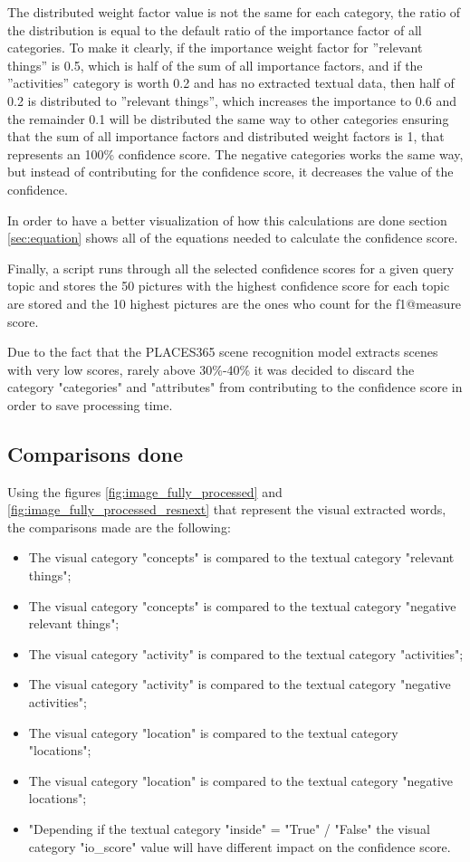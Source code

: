     The distributed weight factor value is not the same for each category, the ratio of the distribution is equal to the default ratio of the importance factor of all categories. To make it clearly, if the importance weight factor for ”relevant things” is 0.5, which is half of the sum of all importance factors, and if the ”activities” category is worth 0.2 and has no extracted textual data, then half of 0.2 is distributed to ”relevant things”, which increases the importance to 0.6 and the remainder 0.1 will be distributed the same way to other categories ensuring that the sum of all importance factors and distributed weight factors is 1, that represents an 100\% confidence score. The negative categories works the same way, but instead of contributing for the confidence score, it decreases the value of the confidence.

    In order to have a better visualization of how this calculations are done section \ref{sec:equation} shows all of the equations needed to calculate the confidence score.

    Finally, a script runs through all the selected confidence scores for a given
    query topic and stores the 50 pictures with the highest confidence score for each topic are stored and the 10 highest pictures are the ones who count for the f1@measure score.
       

    Due to the fact that the PLACES365 scene recognition model extracts scenes with very low scores, rarely above 30\%-40\% it was decided to discard the category "categories" and "attributes" from contributing to the confidence score in order to save processing time.

  
\newpage

    \subsection{Comparisons done  }
    Using the figures \ref{fig:image_fully_processed} and \ref{fig:image_fully_processed_resnext} that represent the visual extracted words, the comparisons made are the following:
    \begin{itemize}
        \itemsep0em
        \item The visual category "concepts" is compared to the textual category "relevant things";
        \item The visual category "concepts" is compared to the textual category "negative relevant things";
        \item The visual category "activity" is compared to the textual category "activities";
        \item The visual category "activity" is compared to the textual category "negative activities";
        \item The visual category "location" is compared to the textual category "locations";
        \item The visual category "location" is compared to the textual category "negative locations";
        \item "Depending if the textual category "inside" = "True" / "False" the visual category "io\_score" value will have different impact on the confidence score.
    \end{itemize}
    

